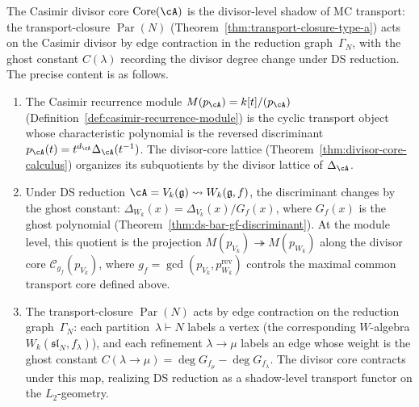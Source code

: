 \begin{construction}
\label{constr:casimir-divisor-shadow}
The Casimir divisor core $\operatorname{Core}(\cA)$ is the
divisor-level shadow of MC transport: the transport-closure
$\operatorname{Par}(N)$
(Theorem~\ref{thm:transport-closure-type-a}) acts on the
Casimir divisor by edge contraction in the reduction
graph~$\Gamma_N$, with the ghost constant $C(\lambda)$
recording the divisor degree change under DS reduction.
The precise content is as follows.
\begin{enumerate}[label=\textup{(\roman*)}]
\item The Casimir recurrence module
 $M(p_\cA) = k[t]/(p_\cA)$
 (Definition~\ref{def:casimir-recurrence-module}) is the
 cyclic transport object whose characteristic polynomial is
 the reversed discriminant
 $p_\cA(t) = t^{d_\cA}\Delta_\cA(t^{-1})$.
 The divisor-core lattice
 (Theorem~\ref{thm:divisor-core-calculus})
 organizes its subquotients by the divisor lattice of
 $\Delta_\cA$.
\item Under DS reduction $\cA = V_k(\mathfrak{g})
 \rightsquigarrow W_k(\mathfrak{g}, f)$, the
 discriminant changes by the ghost constant:
 $\Delta_{W_k}(x) = \Delta_{V_k}(x)/G_f(x)$,
 where $G_f(x)$ is the ghost polynomial
 (Theorem~\ref{thm:ds-bar-gf-discriminant}).
 At the module level, this quotient is the
 projection $M(p_{V_k}) \twoheadrightarrow M(p_{W_k})$
 along the divisor core $\mathcal{C}_{g_f}(p_{V_k})$,
 where $g_f = \gcd(p_{V_k}, p_{W_k}^{\mathrm{rev}})$
 controls the maximal common transport core defined above.
\item The transport-closure $\operatorname{Par}(N)$
 acts by edge contraction on the reduction
 graph~$\Gamma_N$: each partition~$\lambda \vdash N$
 labels a vertex (the corresponding $W$-algebra
 $W_k(\mathfrak{sl}_N, f_\lambda)$), and each
 refinement $\lambda \to \mu$ labels an edge whose
 weight is the ghost constant
 $C(\lambda \to \mu)
 = \deg G_{f_\mu} - \deg G_{f_\lambda}$.
 The divisor core contracts under this map, realizing
 DS reduction as a shadow-level transport functor on the
 $L_2$-geometry.
\end{enumerate}
\end{construction}
